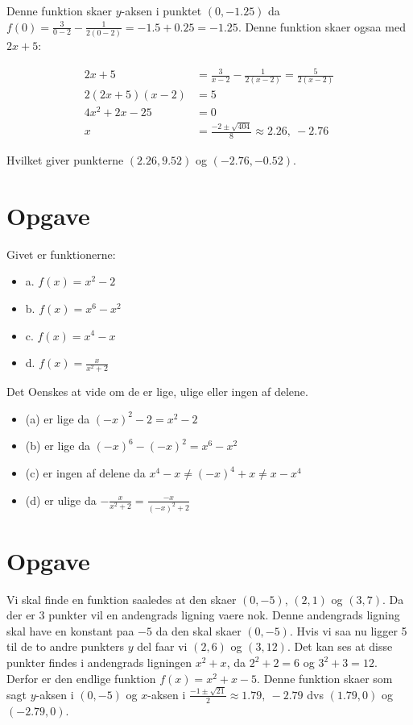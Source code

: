 \documentclass{article}
\begin{document}
Denne funktion skaer $y$-aksen i punktet $(0,-1.25)$ da $f(0) = \frac{3}{0-2} -
\frac{1}{2(0-2)} = -1.5 + 0.25 = -1.25$. Denne funktion skaer ogsaa med $2x+5$:

\begin{align}
	2x+5 &= \frac{3}{x-2} - \frac{1}{2(x-2)} = \frac{5}{2(x-2)} \\
	2(2x+5)(x-2) &= 5 \nonumber \\
	4x^2+2x-25 &= 0 \nonumber \\
	x &= \frac{-2 \pm \sqrt{404}}{8} \approx 2.26,\ -2.76
\end{align}

Hvilket giver punkterne $(2.26,9.52)$ og $(-2.76,-0.52)$.

\section{Opgave}

Givet er funktionerne:

\begin{itemize}
	\item a. $f(x) = x^2-2$
	\item b. $f(x) = x^6-x^2$
	\item c. $f(x) = x^4-x$
	\item d. $f(x) = \frac{x}{x^2+2}$
\end{itemize}

Det Oenskes at vide om de er lige, ulige eller ingen af delene.

\begin{itemize}
	\item (a) er lige da ${(-x)}^2-2 = x^2-2$
	\item (b) er lige da  ${(-x)}^6-{(-x)}^2 = x^6-x^2$
	\item (c) er ingen af delene da  $ x^4-x \neq {(-x)}^4 +x \neq x - x^4$
	\item (d) er ulige da  $- \frac{x}{x^2+2} = \frac{-x}{{(-x)}^2+2}$
\end{itemize}

\section{Opgave}

Vi skal finde en funktion saaledes at den skaer $(0,-5)$, $(2,1)$ og $(3,7)$. Da
der er 3 punkter vil en andengrads ligning vaere nok. Denne andengrads ligning 
skal have en konstant paa $-5$ da den skal skaer $(0,-5)$. Hvis vi saa nu ligger
5 til de to andre punkters $y$ del faar vi $(2,6)$ og $(3,12)$. Det kan ses at
disse punkter findes i andengrads ligningen $x^2+x$, da $2^2+2 = 6$ og $3^2+3 =
12$. Derfor er den endlige funktion $f(x) = x^2 + x - 5$. Denne funktion skaer
som sagt $y$-aksen i $(0,-5)$ og $x$-aksen i $\frac{-1 \pm \sqrt{21}}{2} \approx
1.79,\ -2.79$ dvs $(1.79,0)$ og $(-2.79,0)$.
\end{document}
